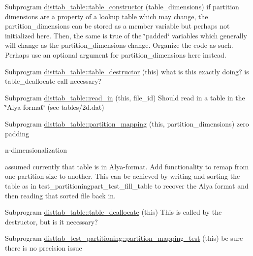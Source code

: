 
\begin{DoxyRefList}
\item[Subprogram \mbox{\hyperlink{namespacedisttab__table_a6b30669a17ed75f6ebac958f890655af}{disttab\+\_\+table\+::table\+\_\+constructor}} (table\+\_\+dimensions)]\label{todo__todo000001}%
%
if partition dimensions are a property of a lookup table which may change, the partition\+\_\+dimensions can be stored as a member variable but perhaps not initialized here. Then, the same is true of the \char`\"{}padded\char`\"{} variables which generally will change as the partition\+\_\+dimensions change. Organize the code as such. Perhaps use an optional argument for partition\+\_\+dimensions here instead.  
\item[Subprogram \mbox{\hyperlink{namespacedisttab__table_a00320b1b054be17b502e8bc01bdfb8cd}{disttab\+\_\+table\+::table\+\_\+destructor}} (this)]\label{todo__todo000002}%
%
what is this exactly doing? is table\+\_\+deallocate call necessary?  
\item[Subprogram \mbox{\hyperlink{namespacedisttab__table_a47c132f14609e77c6bd02ed429aaa515}{disttab\+\_\+table\+::read\+\_\+in}} (this, file\+\_\+id)]\label{todo__todo000003}%
%
Should read in a table in the \char`\"{}\+Alya format\char`\"{} (see tables/2d.\+dat)  
\item[Subprogram \mbox{\hyperlink{namespacedisttab__table_a46780ef5ba062fbd4c874c575f6a3c46}{disttab\+\_\+table\+::partition\+\_\+mapping}} (this, partition\+\_\+dimensions)]\label{todo__todo000004}%
%
zero padding 

n-\/dimensionalization 

assumed currently that table is in Alya-\/format. Add functionality to remap from one partition size to another. This can be achieved by writing and sorting the table as in test\+\_\+partitioningpart\+\_\+test\+\_\+fill\+\_\+table to recover the Alya format and then reading that sorted file back in.  
\item[Subprogram \mbox{\hyperlink{namespacedisttab__table_aa09b941e14a6f94cd56d6531a3abc1cf}{disttab\+\_\+table\+::table\+\_\+deallocate}} (this)]\label{todo__todo000005}%
%
This is called by the destructor, but is it necessary?  
\item[Subprogram \mbox{\hyperlink{namespacedisttab__test__partitioning_a5a71fcde2c7b22ebfad7d1ce5b142407}{disttab\+\_\+test\+\_\+partitioning\+::partition\+\_\+mapping\+\_\+test}} (this)]\label{todo__todo000006}%
%
be sure there is no precision issue 
\end{DoxyRefList}